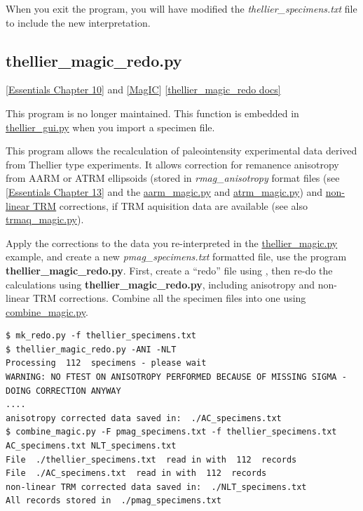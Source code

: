 \documentclass[11pt]{book}
\begin{document}
{{{When you exit the program, you will have modified the {\it thellier\_specimens.txt} file to include the new interpretation.



\subsection{thellier\_magic\_redo.py}
\href{http://earthref.org/MAGIC/books/Tauxe/Essentials/WebBook3ch10.html#ch10}{[Essentials Chapter 10]} and \href{#MagIC}{[MagIC}]
\href{https://github.com/PmagPy/PmagPy/blob/master/programs/thellier_magic_redo.py}{[thellier\_magic\_redo docs]}


This program is no longer maintained. This function is embedded in  \href{#thellier_GUI.py}{thellier\_gui.py} when you import a specimen file.



This program allows the recalculation of paleointensity experimental data derived from Thellier type experiments.  It allows correction for remanence  anisotropy from AARM or ATRM ellipsoids (stored in {\it rmag\_anisotropy} format files (see \href{http://earthref.org/MAGIC/books/Tauxe/Essentials/WebBook3ch13.html#ch13}{[Essentials Chapter 13]} and the \href{#aarm_magic.py}{aarm\_magic.py} and \href{#atrm_magic.py}{atrm\_magic.py}) and \href{http://earthref.org/MAGIC/books/Tauxe/Essentials/WebBook3ch10.html#non-linear_TRM}{non-linear TRM} corrections, if TRM aquisition data are available (see also \href{#trmaq_magic.py}{trmaq\_magic.py}).


Apply the corrections to the  data you re-interpreted in the \href{#thellier_magic.py}{thellier\_magic.py} example,   and create a new {\it pmag\_specimens.txt} formatted file, use the program {\bf thellier\_magic\_redo.py}.   First, create a ``redo'' file using \href{#mk_redo.py}, then re-do the calculations using {\bf thellier\_magic\_redo.py}, including anisotropy and non-linear TRM corrections.    Combine all the specimen files into one using \href{#combine_magic.py}{combine\_magic.py}.

\begin{verbatim}
$ mk_redo.py -f thellier_specimens.txt
$ thellier_magic_redo.py -ANI -NLT
Processing  112  specimens - please wait
WARNING: NO FTEST ON ANISOTROPY PERFORMED BECAUSE OF MISSING SIGMA - DOING CORRECTION ANYWAY
....
anisotropy corrected data saved in:  ./AC_specimens.txt
$ combine_magic.py -F pmag_specimens.txt -f thellier_specimens.txt AC_specimens.txt NLT_specimens.txt
File  ./thellier_specimens.txt  read in with  112  records
File  ./AC_specimens.txt  read in with  112  records
non-linear TRM corrected data saved in:  ./NLT_specimens.txt
All records stored in  ./pmag_specimens.txt
\end{verbatim}

}}}
\end{document}
